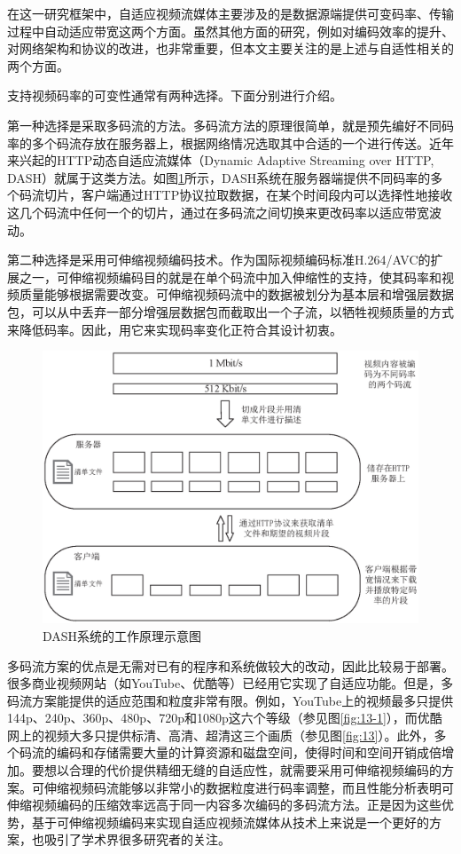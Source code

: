 在这一研究框架中，自适应视频流媒体主要涉及的是数据源端提供可变码率、传输过程中自动适应带宽这两个方面。虽然其他方面的研究，例如对编码效率的提升、对网络架构和协议的改进，也非常重要，但本文主要关注的是上述与自适性相关的两个方面。

支持视频码率的可变性通常有两种选择。下面分别进行介绍。

第一种选择是采取多码流的方法。多码流方法的原理很简单，就是预先编好不同码率的多个码流存放在服务器上，根据网络情况选取其中合适的一个进行传送。近年来兴起的HTTP动态自适应流媒体（Dynamic Adaptive Streaming over HTTP,  DASH）\supercite{Sodagar2011}就属于这类方法。如图\ref{fig:DASH}所示，DASH系统在服务器端提供不同码率的多个码流切片，客户端通过HTTP协议拉取数据，在某个时间段内可以选择性地接收这几个码流中任何一个的切片，通过在多码流之间切换来更改码率以适应带宽波动。

第二种选择是采用可伸缩视频编码\supercite{SVC-Overview}技术。作为国际视频编码标准H.264/AVC\supercite{H.264}的扩展之一，可伸缩视频编码目的就是在单个码流中加入伸缩性的支持，使其码率和视频质量能够根据需要改变。可伸缩视频码流中的数据被划分为基本层和增强层数据包，可以从中丢弃一部分增强层数据包而截取出一个子流，以牺牲视频质量的方式来降低码率。因此，用它来实现码率变化正符合其设计初衷。

\begin{figure}[t]
	\centering
	\includegraphics[width = 1.0\linewidth]{eps/DASH}
	\caption{DASH系统的工作原理示意图\label{fig:DASH}}
\end{figure}

多码流方案的优点是无需对已有的程序和系统做较大的改动，因此比较易于部署\supercite{Bouten2014}。很多商业视频网站（如YouTube、优酷等）已经用它实现了自适应功能。但是，多码流方案能提供的适应范围和粒度非常有限。例如，YouTube上的视频最多只提供144p、240p、360p、480p、720p和1080p这六个等级（参见图\ref{fig:13-1}），而优酷网上的视频大多只提供标清、高清、超清这三个画质（参见图\ref{fig:13}）。此外，多个码流的编码和存储需要大量的计算资源和磁盘空间，使得时间和空间开销成倍增加。要想以合理的代价提供精细无缝的自适应性，就需要采用可伸缩视频编码的方案。可伸缩视频码流能够以非常小的数据粒度进行码率调整，而且性能分析表明可伸缩视频编码的压缩效率远高于同一内容多次编码的多码流方法\supercite{SVC-Performance}。正是因为这些优势，基于可伸缩视频编码来实现自适应视频流媒体从技术上来说是一个更好的方案，也吸引了学术界很多研究者的关注\supercite{Chuah2012, Zhu2013, Dan2013, Yang2014, Cicalo2014}。

